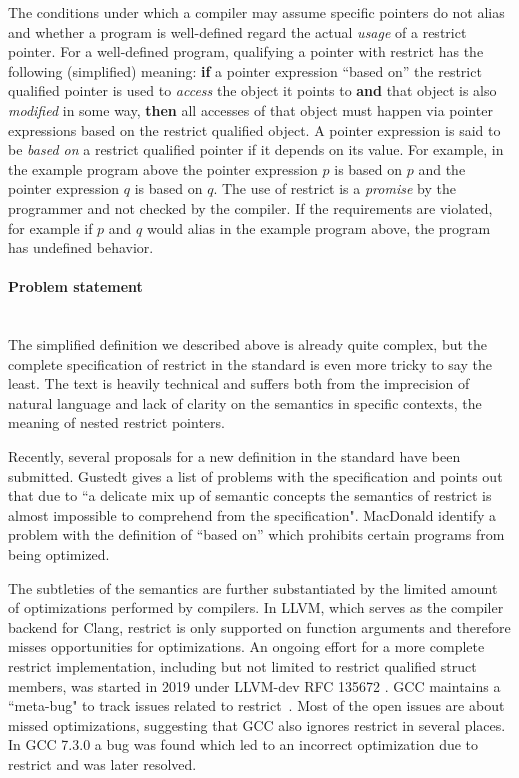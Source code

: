 The conditions under which a compiler may assume specific pointers do not alias and whether a program is well-defined regard the actual \textit{usage} of a restrict pointer.
For a well-defined program, qualifying a pointer with restrict has the following (simplified) meaning:
\textbf{if} a pointer expression ``based on'' the restrict qualified pointer is used to \textit{access} the object it points to
\textbf{and} that object is also \textit{modified} in some way, \textbf{then} all accesses of that object must happen
via pointer expressions based on the restrict qualified object.
A pointer expression is said to be \textit{based on} a restrict qualified pointer if it depends on its value. 
For example, in the example program above the pointer expression $p$ is based on $p$ and the pointer expression $q$ is based on $q$.
The use of restrict is a \textit{promise} by the programmer and not checked by the compiler.
If the requirements are violated, for example if $p$ and $q$ would alias in the example program above, the program has undefined behavior.


\paragraph{Problem statement} \leavevmode\\
The simplified definition we described above is already quite complex, but the complete specification of restrict in the standard is even more tricky to say the least.
The text is heavily technical and suffers both from the imprecision of natural language and lack of clarity on the semantics in
specific contexts, \eg the meaning of nested restrict pointers.

Recently, several proposals for a new definition in the standard have been submitted.
Gustedt \cite{semanticsgustedt2024} gives a list of problems with the specification and points out that due to
``a delicate mix up of semantic concepts the semantics of restrict is almost impossible to comprehend from the specification".
MacDonald \etall \cite{provmacdonald2022, defectr2macdonald2024} identify a problem with the definition of ``based on''
which prohibits certain programs from being optimized.

The subtleties of the semantics are further substantiated by the limited amount of optimizations performed by compilers.
In LLVM, which serves as the compiler backend for \eg Clang, restrict is only supported on function arguments and therefore misses opportunities for optimizations.
An ongoing effort for a more complete restrict implementation, including but not limited to restrict qualified struct members, was started in 2019 under LLVM-dev RFC 135672 \cite{rfcdobbelaere2019}.
GCC maintains a ``meta-bug" to track issues related to restrict~\cite{gccbugzillabiener2011}.
Most of the open issues are about missed optimizations, suggesting that GCC also ignores restrict in several places.
In GCC 7.3.0 a bug was found which led to an incorrect optimization due to restrict \cite{johnsonclarifying2018}
and was later resolved.

